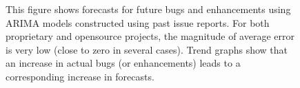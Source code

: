 \begin{figure}[htbp]
\begin{subfigure}[t]{0.5\linewidth}
	\end{subfigure}%
	\caption{This figure shows forecasts for future bugs and enhancements using ARIMA models constructed using past issue reports. For both proprietary and opensource projects, the magnitude of average error is very low (close to zero in several cases). Trend graphs show that an increase in actual bugs (or enhancements) leads to a corresponding increase in forecasts.}
	\label{fig:rq3}
\end{figure}

